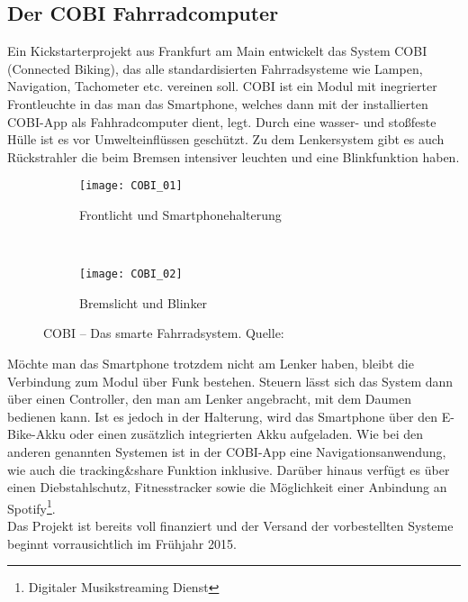 \subsection{Der COBI Fahrradcomputer}
Ein Kickstarterprojekt aus Frankfurt am Main entwickelt das System \textsc{COBI} (Connected Biking), das alle standardisierten Fahrradsysteme wie Lampen, Navigation, Tachometer etc. vereinen soll. \textsc{COBI} ist ein Modul mit inegrierter Frontleuchte in das man das \gls{Smartphone}, welches dann mit der installierten \textsc{COBI}-\Gls{App} als Fahhradcomputer dient, legt. Durch eine wasser- und stoßfeste Hülle ist es vor Umwelteinflüssen geschützt. Zu dem Lenkersystem gibt es auch Rückstrahler die beim Bremsen intensiver leuchten und eine Blinkfunktion haben.
\begin{figure}[H]
        \centering
        \begin{subfigure}[b]{0.49\textwidth}
                \texttt{[image: COBI\_01]}
                \caption{Frontlicht und Smartphonehalterung}
                \label{fig:cobi1}
        \end{subfigure}%
        ~ %
        \begin{subfigure}[b]{0.49\textwidth}
                \texttt{[image: COBI\_02]}
                \caption{Bremslicht und Blinker}
                \label{fig:cobi2}
        \end{subfigure}
        \caption[COBI]{COBI -- Das smarte Fahrradsystem. Quelle: \cite{cobi_pic}}
        \label{fig:cobi}
\end{figure}
Möchte man das \gls{Smartphone} trotzdem nicht am Lenker haben, bleibt die Verbindung zum Modul über Funk bestehen. Steuern lässt sich das System dann über einen Controller, den man am Lenker angebracht, mit dem Daumen bedienen kann. Ist es jedoch in der Halterung, wird das \gls{Smartphone} über den E-Bike-Akku oder einen zusätzlich integrierten Akku aufgeladen. Wie bei den anderen genannten Systemen ist in der \textsc{COBI}-\Gls{App} eine Navigationsanwendung, wie auch die tracking\&share Funktion inklusive. Darüber hinaus verfügt es über einen Diebstahlschutz, Fitnesstracker sowie die Möglichkeit einer Anbindung an Spotify\footnote{ Digitaler Musikstreaming Dienst}.\\
Das Projekt ist bereits voll finanziert und der Versand der vorbestellten Systeme beginnt vorrausichtlich im Frühjahr 2015\cite{cobi}.
